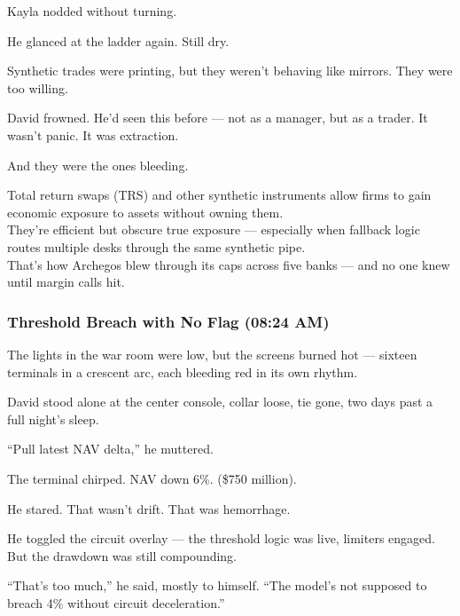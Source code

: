 \medskip


Kayla nodded without turning.

He glanced at the ladder again.
Still dry.

Synthetic trades were printing, but they weren’t behaving like mirrors. They were too willing.

David frowned.
He'd seen this before — not as a manager, but as a trader.
It wasn’t panic.
It was extraction.

And they were the ones bleeding.

\begin{tcolorbox}[title=Leverage via Synthetic Exposure, colback=gray!5, colframe=black]
Total return swaps (TRS) and other synthetic instruments allow firms to gain economic exposure to assets without owning them.\\
They’re efficient but obscure true exposure — especially when fallback logic routes multiple desks through the same synthetic pipe.\\
That’s how Archegos blew through its caps across five banks — and no one knew until margin calls hit.
\end{tcolorbox}

\subsubsection{Threshold Breach with No Flag (08:24 AM)} 

The lights in the war room were low, but the screens burned hot — sixteen terminals in a crescent arc, each bleeding red in its own rhythm.

David stood alone at the center console, collar loose, tie gone, two days past a full night’s sleep.

“Pull latest NAV delta,” he muttered.

The terminal chirped.
NAV down 6\%.
(\$750 million).

He stared. That wasn’t drift. That was hemorrhage.

He toggled the circuit overlay — the threshold logic was live, limiters engaged. But the drawdown was still compounding.

“That’s too much,” he said, mostly to himself. “The model’s not supposed to breach 4\% without circuit deceleration.”

\medskip

